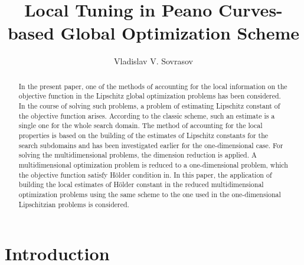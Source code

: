 \documentclass[procedia]{easychair}
\title{Local Tuning in Peano Curves-based Global Optimization Scheme}
\author{
    Vladislav V. Sovrasov%
}
\institute{
  State University of Nizhny Novgorod,
  Nizhny Novgorod, Russia\\
  \email{sovrasov.vlad@gmail.com}
 }
\begin{document}
\maketitle


\begin{abstract}
  In the present paper, one of the methods of accounting for the local information on
  the objective function in the Lipschitz global optimization problems has been considered.
  In the course of solving such problems, a problem of estimating Lipschitz constant of the
  objective function arises. According to the classic scheme, such an estimate is a single one
  for the whole search domain. The method of accounting for the local properties is based on
  the building of the estimates of Lipschitz constants for the search subdomains and has been
  investigated earlier for the one-dimensional case. For solving the multidimensional problems,
  the dimension reduction is applied. A multidimensional optimization problem is reduced to
  a one-dimensional problem, which the objective function satisfy Hölder condition in.
  In this paper, the application of building the local estimates of Hölder constant in the
  reduced multidimensional optimization problems using the same scheme to the one used
  in the one-dimensional Lipschitzian problems is considered.
\end{abstract}


%
%


\section{Introduction}
\label{sect:introduction}
\end{document}
